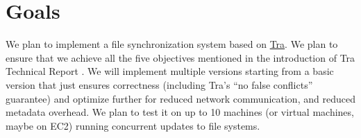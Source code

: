 \section{Goals}
We plan to implement a file synchronization system based on \href{http://swtch.com/tra/}{Tra}. We plan to ensure that we achieve all the five objectives mentioned in the introduction of Tra Technical Report \cite{tra-tech-report}. We will implement multiple versions starting from a basic version that just ensures correctness (including Tra's ``no false conflicts'' guarantee) and optimize further for reduced network communication, and reduced metadata overhead. We plan to test it on up to 10 machines (or virtual machines, maybe on EC2) running concurrent updates to file systems.
